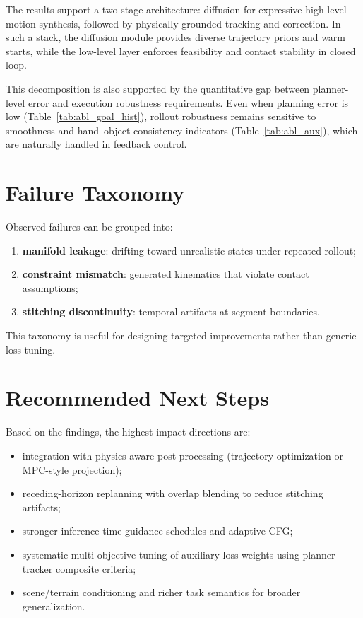 The results support a two-stage architecture: diffusion for expressive high-level motion synthesis, followed by physically grounded tracking and correction. In such a stack, the diffusion module provides diverse trajectory priors and warm starts, while the low-level layer enforces feasibility and contact stability in closed loop.

This decomposition is also supported by the quantitative gap between planner-level error and execution robustness requirements. Even when planning error is low (Table~\ref{tab:abl_goal_hist}), rollout robustness remains sensitive to smoothness and hand--object consistency indicators (Table~\ref{tab:abl_aux}), which are naturally handled in feedback control.

\section{Failure Taxonomy}

Observed failures can be grouped into:
\begin{enumerate}
	\item \textbf{manifold leakage}: drifting toward unrealistic states under repeated rollout;
	\item \textbf{constraint mismatch}: generated kinematics that violate contact assumptions;
	\item \textbf{stitching discontinuity}: temporal artifacts at segment boundaries.
\end{enumerate}

This taxonomy is useful for designing targeted improvements rather than generic loss tuning.

\section{Recommended Next Steps}

Based on the findings, the highest-impact directions are:
\begin{itemize}
	\item integration with physics-aware post-processing (trajectory optimization or MPC-style projection);
	\item receding-horizon replanning with overlap blending to reduce stitching artifacts;
	\item stronger inference-time guidance schedules and adaptive CFG;
	\item systematic multi-objective tuning of auxiliary-loss weights using planner--tracker composite criteria;
	\item scene/terrain conditioning and richer task semantics for broader generalization.
\end{itemize}

